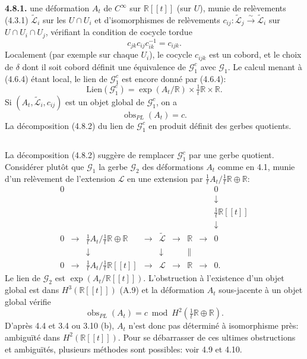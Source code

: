 \documentclass[11pt,a4paper]{article}
\theoremstyle{plain}
\theoremstyle{definition}
\DeclareMathOperator{\obs}{obs}
\newcommand{\R}{\mathbb{R}}
\newcommand{\iso}{\xrightarrow{\sim}}
\begin{document}
\textbf{4.8.1.} une d\'eformation $A_{t}$ de $C^{\infty}$ sur $\R[[t]]$ (sur $U$), munie de rel\`evements (4.3.1) $\widetilde{\mathcal{L}}_{i}$ sur les $U \cap U_{i}$ et d'isomorphismes de rel\`evements $c_{ij}: \widetilde{\mathcal{L}}_{j} \iso \widetilde{\mathcal{L}}_{i}$ sur $U \cap U_{i} \cap U_{j}$, v\'erifiant la condition de cocycle tordue
\[
c_{jk} c_{ij} c_{ik}^{-1} = c_{ijk}.
\]
Localement (par exemple sur chaque $U_{i}$), le cocycle $c_{ijk}$ est un cobord, et le
choix de $\delta$ dont il soit cobord d\'efinit une \'equivalence de $\mathcal{G}_{1}^{c}$ avec $\mathcal{G}_{1}$. Le calcul menant
\`a (4.6.4) \'etant local, le lien de $\mathcal{G}_{1}^{c}$ est encore donn\'e par (4.6.4):
\begin{equation}
\text{Lien}(\mathcal{G}_{1}^{c}) = \exp(A_{t}/\R) \times \tfrac{1}{t}\R \times \R. \tag{4.8.2}
\end{equation}
Si $(A_{t}, \widetilde{\mathcal{L}}_{i}, c_{ij})$ est un objet global de $\mathcal{G}_{1}^{c}$, on a
\begin{equation}
\obs_{PL}(A_{t}) = c. \tag{4.8.3}
\end{equation}
La d\'ecomposition (4.8.2) du lien de $\mathcal{G}_{1}^{c}$ en produit d\'efinit des gerbes quotients.

\subsection{}
La d\'ecomposition (4.8.2) sugg\`ere de remplacer $\mathcal{G}_{1}^{c}$ par une gerbe quotient. Consid\'erer plut\^ot que $\mathcal{G}_{1}$ la gerbe $\mathcal{G}_{2}$ des d\'eformations $A_{t}$ comme en 4.1, munie d'un rel\`evement de l'extension $\mathcal{L}$ en une extension par $\tfrac{1}{t}A_{t}/\tfrac{1}{t}\R \oplus \R$:
\[
\begin{array}{ccccccccc}
0 & & & & & & & & 0 \\
& & & & & & & & \downarrow \\
& & & & & & & & \tfrac{1}{t}\R[[t]] \\
& & & & & & & & \downarrow \\
0 & \longrightarrow & \tfrac{1}{t}A_{t}/\tfrac{1}{t}\R \oplus \R & \longrightarrow & \widetilde{\mathcal{L}} & \longrightarrow & \R & \longrightarrow & 0 \\
& & \downarrow & & \downarrow & & \| & & \\
0 & \longrightarrow & \tfrac{1}{t}A_{t}/\tfrac{1}{t}\R[[t]] & \longrightarrow & \mathcal{L} & \longrightarrow & \R & \longrightarrow & 0.
\end{array} \tag{4.8.4}
\]
Le lien de $\mathcal{G}_{2}$ est $\exp(A_{t}/\R[[t]])$. L'obstruction \`a l'existence d'un objet global est dans $H^{3}(\R[[t]])$ (A.9) et la d\'eformation $A_{t}$ sous-jacente \`a un objet global v\'erifie
\[
\obs_{PL}(A_{t}) = c \bmod H^{2}(\tfrac{1}{t}\R \oplus \R).
\]
D'apr\`es 4.4 et 3.4 ou 3.10 (b), $A_{t}$ n'est donc pas d\'etermin\'e \`a isomorphisme pr\`es: ambigu\"it\'e dans $H^{2}(\R[[t]])$. Pour se d\'ebarrasser de ces ultimes obstructions et ambigu\"it\'es, plusieurs m\'ethodes sont possibles: voir 4.9 et 4.10.
\end{document}
